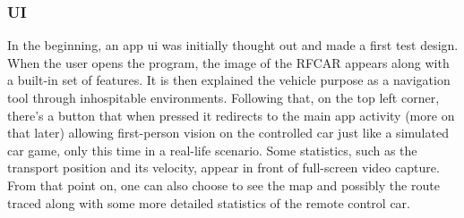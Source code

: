 \subsubsection{UI}%
\label{sec:user-interface}
In the beginning, an app \gls{ui} was initially thought out and made a first test design.
When the user opens the program, the image of the RFCAR appears along with a built-in set of features. It is then explained the vehicle purpose as a navigation tool through inhospitable environments.
%
Following that, on the top left corner, there's a button that when pressed it redirects to the main app activity (more on that later) allowing first-person vision on the controlled car just like a simulated car game, only this time in a real-life scenario. Some statistics, such as the transport position and its velocity, appear in front of full-screen video capture.
%
From that point on, one can also choose to see the map and possibly the route traced along with some more detailed statistics of the remote control car.
%

